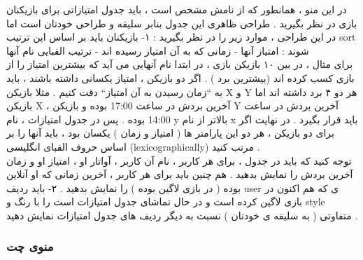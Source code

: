 \documentclass[]{article}
\begin{document}
در این منو ، همانطور که از نامش مشخص است ، باید جدول امتیازاتی برای بازیکنان بازی در نظر بگیرید . طراحی ظاهری این جدول بنابر سلیقه و طراحی خودتان است اما در این طراحی ، موارد زیر را در نظر بگیرید :
۱- بازیکنان باید بر اساس این ترتیب sort شوند : امتیاز آنها - زمانی که به آن امتیاز رسیده اند - ترتیب الفبایی نام آنها \\
برای مثال ، در بین ۱۰ بازیکن بازی ، در ابتدا نام آنهایی می آید که بیشترین امتیاز را از بازی کسب کرده اند (بیشترین برد ) . اگر دو بازیکن ، امتیاز یکسانی داشته باشند ، باید به “زمان رسیدن به آن امتیاز“ دقت کنیم . مثلا بازیکن X و Y هر دو ۴ برد داشته اند اما بازیکن X ، آخرین بردش در ساعت 17:00 بوده و بازیکن Y آخرین بردش در ساعت 14:00 بوده . پس در جدول امتیازات ، نام y بالاتر از نام x باید قرار بگیرد . در نهایت اگر برای دو بازیکن ، هر دو این پارامتر ها ( امتیاز و زمان ) یکسان بود ، باید آنها را بر اساس حروف الفبای انگلیسی (lexicographically) مرتب کنید .\\
توجه کنید که باید در جدول ، برای هر کاربر ، نام آن کاربر ، آواتار او ، امتیاز او و زمان آخرین بردش را نمایش بدهید . هم چنین باید برای هر کاربر ، آخرین زمانی که او آنلاین بوده ( در بازی لاگین بوده ) را نمایش بدهید .
۲- باید ردیف user ی که هم اکنون در بازی لاگین کرده است و در حال تماشای جدول امتیازات است را با رنگ و style متفاوتی ( به سلیقه ی خودتان ) نسبت به دیگر ردیف های جدول امتیازات نمایش دهید .


\subsubsection*{{\titr منوی چت}}
\end{document}
